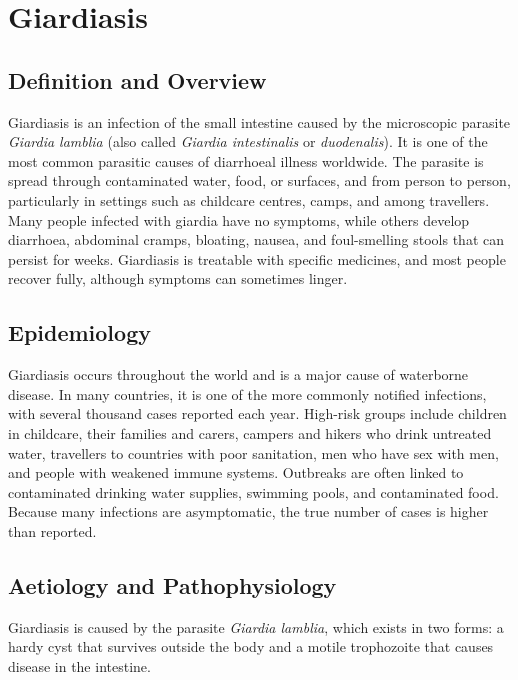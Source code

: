 \chapter{Giardiasis}

\section*{Definition and Overview}
Giardiasis is an infection of the small intestine caused by the microscopic parasite \textit{Giardia lamblia} (also called \textit{Giardia intestinalis} or \textit{duodenalis}). It is one of the most common parasitic causes of diarrhoeal illness worldwide. The parasite is spread through contaminated water, food, or surfaces, and from person to person, particularly in settings such as childcare centres, camps, and among travellers. Many people infected with giardia have no symptoms, while others develop diarrhoea, abdominal cramps, bloating, nausea, and foul-smelling stools that can persist for weeks. Giardiasis is treatable with specific medicines, and most people recover fully, although symptoms can sometimes linger.

\section*{Epidemiology}
Giardiasis occurs throughout the world and is a major cause of waterborne disease. In many countries, it is one of the more commonly notified infections, with several thousand cases reported each year. High-risk groups include children in childcare, their families and carers, campers and hikers who drink untreated water, travellers to countries with poor sanitation, men who have sex with men, and people with weakened immune systems. Outbreaks are often linked to contaminated drinking water supplies, swimming pools, and contaminated food. Because many infections are asymptomatic, the true number of cases is higher than reported.

\section*{Aetiology and Pathophysiology}
Giardiasis is caused by the parasite \textit{Giardia lamblia}, which exists in two forms: a hardy cyst that survives outside the body and a motile trophozoite that causes disease in the intestine.

